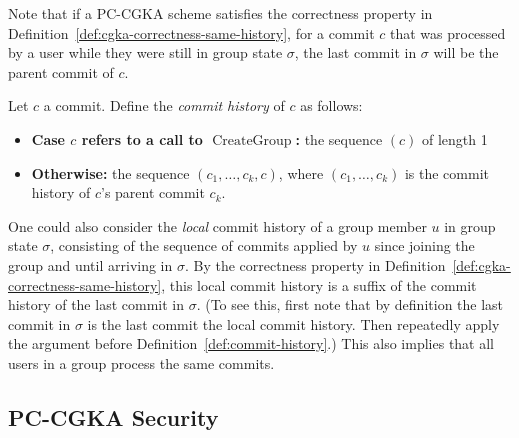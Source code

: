 Note that if a PC-CGKA scheme satisfies the correctness property in Definition~\ref{def:cgka-correctness-same-history}, for a commit $c$ that was processed by a user while they were still in group state $\sigma$, the last commit in $\sigma$ will be the parent commit of $c$.

\begin{definition} \label{def:commit-history}
	Let $c$ a commit. Define the \emph{commit history} of $c$ as follows:
	\begin{itemize}
		\item \textbf{Case $c$ refers to a call to $\operatorname{CreateGroup}$:} the sequence $(c)$ of length 1
		\item \textbf{Otherwise:} the sequence $(c_1, \ldots, c_k, c)$, where $(c_1, \ldots, c_k)$ is the commit history of $c$'s parent commit $c_k$.
	\end{itemize}
\end{definition}

One could also consider the \emph{local} commit history of a group member $u$ in group state $\sigma$, consisting of the sequence of commits applied by $u$ since joining the group and until arriving in $\sigma$. By the correctness property in Definition~\ref{def:cgka-correctness-same-history}, this local commit history is a suffix of the commit history of the last commit in $\sigma$. (To see this, first note that by definition the last commit in $\sigma$ is the last commit the local commit history. Then repeatedly apply the argument before Definition~\ref{def:commit-history}.) This also implies that all users in a group process the same commits.

\subsection{PC-CGKA Security}

